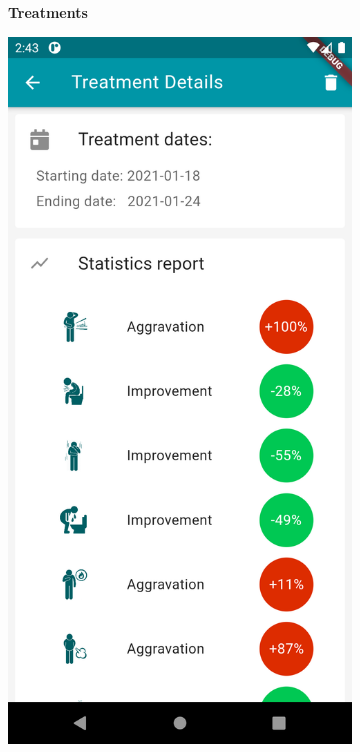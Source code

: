 \documentclass [12pt]{article}
\begin{document}
\begin{description}[leftmargin=1cm,rightmargin=1cm]
\begin{figure}[h!]
\begin{subfigure}[tl]{0.3\linewidth}
\caption{\textbf{Treatments}}
\end{subfigure}\hfill
\begin{subfigure}[tr]{0.3\linewidth}
\includegraphics[width=\linewidth]{treatments2.PNG}

\end{subfigure}
\end{figure}
\end{description}
\end{document}
